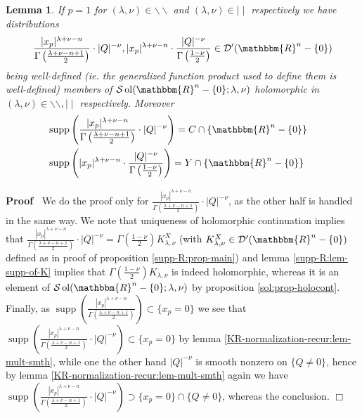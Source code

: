 \documentclass[12pt]{article}
\newcommand{\tmop}[1]{\ensuremath{\operatorname{#1}}}
\renewenvironment{proof}{\noindent\textbf{Proof\ }}{\hspace*{\fill}$\Box$\medskip}
\newtheorem{lemma}[proposition]{Lemma}
\theoremstyle{remark}
\begin{document}
\begin{lemma}
  \label{supp-sing:lem-strangeelement}If $p = 1$ for $(\lambda, \nu) \in
  \backslash\backslash$ and $(\lambda, \nu) \in \mid \mid$ respectively we
  have distributions
  \[ \frac{| x_p |^{\lambda + \nu - n}}{\Gamma \left( \frac{\lambda + \nu - n
     + 1}{2} \right)} \cdot | Q |^{- \nu}, | x_p |^{\lambda + \nu - n} \cdot
     \frac{| Q |^{- \nu}}{\Gamma \left( \frac{1 - \nu}{2} \right)} \in
     \mathcal{D}' (\mathbbm{R}^n - \{ 0 \}) \]
  being well-defined (ie. the generalized function product used to define them
  is well-defined) members of $\mathcal{S} \tmop{ol} (\mathbbm{R}^n - \{ 0 \}
  ; \lambda, \nu)$ holomorphic in $(\lambda, \nu) \in \backslash\backslash,
  \mid \mid$ respectively. Moreover
  \begin{eqnarray}
    & \tmop{supp} \left( \frac{| x_p |^{\lambda + \nu - n}}{\Gamma \left(
    \frac{\lambda + \nu - n + 1}{2} \right)} \cdot | Q |^{- \nu} \right) = C
    \cap \{ \mathbbm{R}^n - \{ 0 \} \} &  \nonumber\\
    & \tmop{supp} \left( | x_p |^{\lambda + \nu - n} \cdot \frac{| Q |^{-
    \nu}}{\Gamma \left( \frac{1 - \nu}{2} \right)} \right) = Y \cap \{
    \mathbbm{R}^n - \{ 0 \} \} &  \nonumber
  \end{eqnarray}
\end{lemma}

\begin{proof}
  We do the proof only for $\frac{| x_p |^{\lambda + \nu - n}}{\Gamma \left(
  \frac{\lambda + \nu - n + 1}{2} \right)} \cdot | Q |^{- \nu}$, as the other
  half is handled in the same way. We note that uniqueness of holomorphic
  continuation implies that $\frac{| x_p |^{\lambda + \nu - n}}{\Gamma \left(
  \frac{\lambda + \nu - n + 1}{2} \right)} \cdot | Q |^{- \nu} = \Gamma \left(
  \frac{1 - \nu}{2} \right) K_{\lambda, \nu}^X$ (with $K_{\lambda, \nu}^X \in
  \mathcal{D}' (\mathbbm{R}^n - \{ 0 \})$ defined as in proof of proposition
  \ref{supp-R:prop-main}) and lemma \ref{supp-R:lem-supp-of-K} implies that
  $\Gamma \left( \frac{1 - \nu}{2} \right) K_{\lambda, \nu}$ is indeed
  holomorphic, whereas it is an element of $\mathcal{S} \tmop{ol}
  (\mathbbm{R}^n - \{ 0 \} ; \lambda, \nu)$ by proposition
  \ref{sol:prop-holocont}. Finally, as $\tmop{supp} \left( \frac{| x_p
  |^{\lambda + \nu - n}}{\Gamma \left( \frac{\lambda + \nu - n + 1}{2}
  \right)} \right) \subset \{ x_p = 0 \}$ we see that $\tmop{supp} \left(
  \frac{| x_p |^{\lambda + \nu - n}}{\Gamma \left( \frac{\lambda + \nu - n +
  1}{2} \right)} \cdot | Q |^{- \nu} \right) \subset \{ x_p = 0 \}$ by lemma
  \ref{KR-normalization-recur:lem-mult-smth}, while one the other hand $| Q
  |^{- \nu}$ is smooth nonzero on $\{ Q \neq 0 \}$, hence by lemma
  \ref{KR-normalization-recur:lem-mult-smth} again we have $\tmop{supp} \left(
  \frac{| x_p |^{\lambda + \nu - n}}{\Gamma \left( \frac{\lambda + \nu - n +
  1}{2} \right)} \cdot | Q |^{- \nu} \right) \supset \{ x_p = 0 \} \cap \{ Q
  \neq 0 \}$, whereas the conclusion.
\end{proof}
\end{document}
